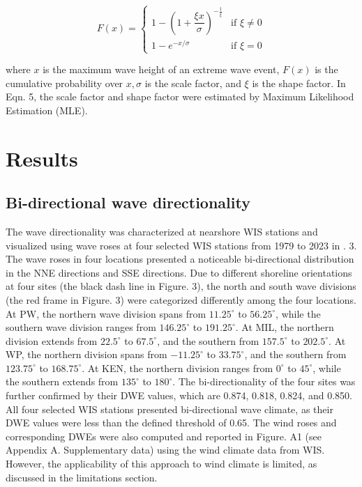 \begin{equation}
    F(x) =
\begin{cases}
1 - \left(1 + \dfrac{\xi x}{\sigma} \right)^{-\frac{1}{\xi}} & \text{if } \xi \ne 0 \\
1 - e^{-x/\sigma} & \text{if } \xi = 0
\end{cases}
\end{equation}

where $x$ is the maximum wave height of an extreme wave event, $F(x)$ is the cumulative probability over $x, \sigma$ is the scale factor, and $\xi$ is the shape factor. In Eqn. 5, the scale factor and shape factor were estimated by Maximum Likelihood Estimation (MLE). 

\section{Results}
\label{c3_Results}

\subsection{Bi-directional wave directionality}
\label{c3_Bi-directional wave directionality}

The wave directionality was characterized at nearshore WIS stations and visualized using wave roses at four selected WIS stations from 1979 to 2023 in . 3. The wave roses in four locations presented a noticeable bi-directional distribution in the NNE directions and SSE directions. Due to different shoreline orientations at four sites (the black dash line in Figure. 3), the north and south wave divisions (the red frame in Figure. 3) were categorized differently among the four locations. At PW, the northern wave division spans from $11.25^\circ$ to $56.25^\circ$, while the southern wave division ranges from $146.25^\circ$ to $191.25^\circ$. At MIL, the northern division extends from $22.5^\circ$ to $67.5^\circ$, and the southern from $157.5^\circ$ to $202.5^\circ$. At WP, the northern division spans from $-11.25^\circ$ to $33.75^\circ$, and the southern from $123.75^\circ$ to $168.75^\circ$. At KEN, the northern division ranges from $0^\circ$ to $45^\circ$, while the southern extends from $135^\circ$ to $180^\circ$. The bi-directionality of the four sites was further confirmed by their DWE values, which are 0.874, 0.818, 0.824, and 0.850. All four selected WIS stations presented bi-directional wave climate, as their DWE values were less than the defined threshold of 0.65. The wind roses and corresponding DWEs were also computed and reported in Figure. A1 (see Appendix A. Supplementary data) using the wind climate data from WIS. However, the applicability of this approach to wind climate is limited, as discussed in the limitations section.

